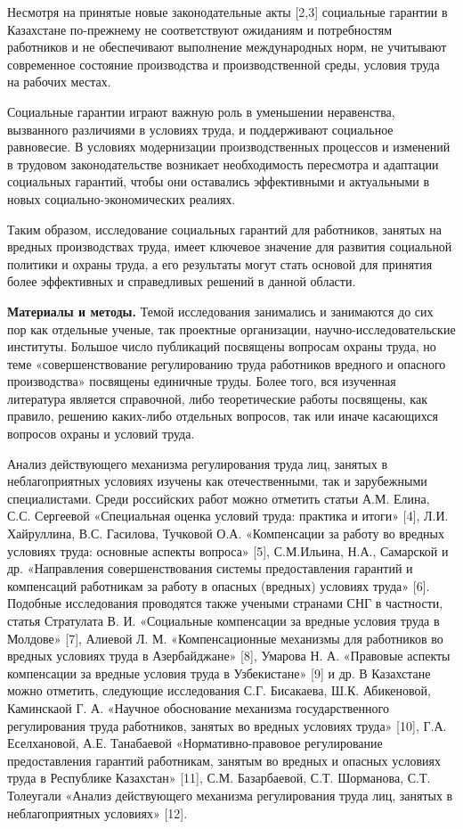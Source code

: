 Несмотря на принятые новые законодательные акты {[}2,3{]} социальные
гарантии в Казахстане по-прежнему не соответствуют ожиданиям и
потребностям работников и не обеспечивают выполнение международных норм,
не учитывают современное состояние производства и производственной
среды, условия труда на рабочих местах.

Социальные гарантии играют важную роль в уменьшении неравенства,
вызванного различиями в условиях труда, и поддерживают социальное
равновесие. В условиях модернизации производственных процессов и
изменений в трудовом законодательстве возникает необходимость пересмотра
и адаптации социальных гарантий, чтобы они оставались эффективными и
актуальными в новых социально-экономических реалиях.

Таким образом, исследование социальных гарантий для работников, занятых
на вредных производствах труда, имеет ключевое значение для развития
социальной политики и охраны труда, а его результаты могут стать основой
для принятия более эффективных и справедливых решений в данной области.

{\bfseries Материалы и методы.} Темой исследования занимались и занимаются
до сих пор как отдельные ученые, так проектные организации,
научно-исследовательские институты. Большое число публикаций посвящены
вопросам охраны труда, но теме «совершенствование регулированию труда
работников вредного и опасного производства» посвящены единичные труды.
Более того, вся изученная литература является справочной, либо
теоретические работы посвящены, как правило, решению каких-либо
отдельных вопросов, так или иначе касающихся вопросов охраны и условий
труда.

Анализ действующего механизма регулирования труда лиц, занятых в
неблагоприятных условиях изучены как отечественными, так и зарубежными
специалистами. Среди российских работ можно отметить статьи А.М. Елина,
С.С. Сергеевой «Специальная оценка условий труда: практика и итоги»
{[}4{]}, Л.И. Хайруллина, В.С. Гасилова, Тучковой О.А. «Компенсации за
работу во вредных условиях труда: основные аспекты вопроса» {[}5{]},
С.М.Ильина, Н.А., Самарской и др. «Направления совершенствования системы
предоставления гарантий и компенсаций работникам за работу в опасных
(вредных) условиях труда» {[}6{]}. Подобные исследования проводятся
также учеными странами СНГ в частности, статья Стратулата В. И.
«Социальные компенсации за вредные условия труда в Молдове» {[}7{]},
Алиевой Л. М. «Компенсационные механизмы для работников во вредных
условиях труда в Азербайджане» {[}8{]}, Умарова Н. А. «Правовые аспекты
компенсации за вредные условия труда в Узбекистане» {[}9{]} и др. В
Казахстане можно отметить, следующие исследования С.Г. Бисакаева, Ш.К.
Абикеновой, Каминскаой Г. А. «Научное обоснование механизма
государственного регулирования труда работников, занятых во вредных
условиях труда» {[}10{]}, Г.А. Еселхановой, А.Е. Танабаевой
«Нормативно-правовое регулирование предоставления гарантий работникам,
занятым во вредных и опасных условиях труда в Республике Казахстан»
{[}11{]}, С.М. Базарбаевой, С.Т. Шорманова, С.Т. Толеугали «Анализ
действующего механизма регулирования труда лиц, занятых в
неблагоприятных условиях» {[}12{]}.

